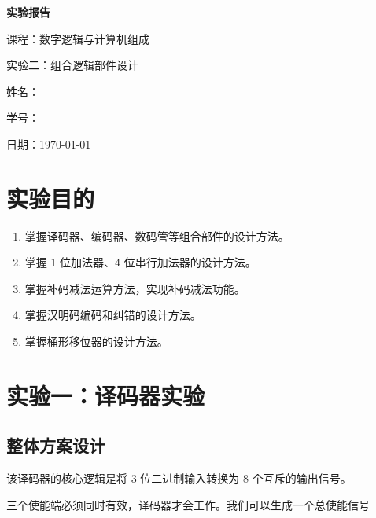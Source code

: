 \documentclass[12pt, a4paper]{ctexart}
\begin{document}
\begin{titlepage}
    \centering
    \vspace*{5cm}
    {\Huge\bfseries 实验报告\par}
    \vspace{2cm}
    {\Large 课程：数字逻辑与计算机组成\par}
    \vspace{1cm}
    {\Large 实验二：组合逻辑部件设计\par}
    \vspace{4cm}
    {\large 姓名：\underline{}\par}
    \vspace{1cm}
    {\large 学号：\underline{}\par}
    \vspace{1cm}
    {\large 日期：\today\par}
\end{titlepage}

\tableofcontents
\enlargethispage{\baselineskip}
\newpage

\section{实验目的}

\begin{enumerate}
    \item 掌握译码器、编码器、数码管等组合部件的设计方法。
    \item 掌握 1 位加法器、4 位串行加法器的设计方法。
    \item 掌握补码减法运算方法，实现补码减法功能。
    \item 掌握汉明码编码和纠错的设计方法。
    \item 掌握桶形移位器的设计方法。
\end{enumerate}

\section{实验一：译码器实验}

\subsection{整体方案设计}

该译码器的核心逻辑是将 3 位二进制输入转换为 8 个互斥的输出信号。

三个使能端必须同时有效，译码器才会工作。我们可以生成一个总使能信号
\end{document}
